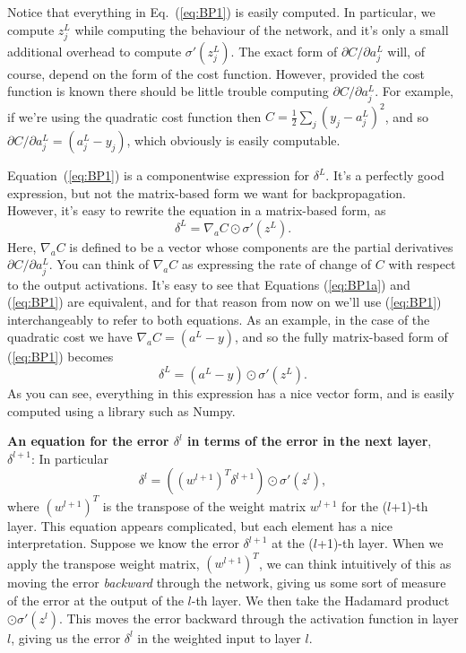 \documentclass[a4paper,twoside,10pt]{book}
\begin{document}
Notice that everything in Eq.~(\ref{eq:BP1}) is easily computed. In particular, we compute $z^L_j$ while computing the behaviour of the network, and it's only a small additional overhead to compute $\sigma'(z^L_j)$. The exact form of $\partial{}C/\partial{}a^L_j$ will, of course, depend on the form of the cost function. However, provided the cost function is known there should be little trouble computing $\partial{}C/\partial{}a^L_j$. For example, if we're using the quadratic cost function then $C=\frac12\sum_j(y_j-a^L_j)^2$, and so $\partial{}C/\partial{}a^L_j=(a^L_j-y_j)$, which obviously is easily computable.

Equation~(\ref{eq:BP1}) is a componentwise expression for $\delta^L$. It's a perfectly good expression, but not the matrix-based form we want for backpropagation. However, it's easy to rewrite the equation in a matrix-based form, as
\begin{equation}
\delta^L = \nabla_a C \odot \sigma'(z^L).
\tag{BP1a}\label{eq:BP1a}
\end{equation}
Here, $\nabla_a C$ is defined to be a vector whose components are the partial derivatives $\partial{}C/\partial{}a^L_j$. You can think of $\nabla_a C$ as expressing the rate of change of $C$ with respect to the output activations. It's easy to see that Equations (\ref{eq:BP1a}) and (\ref{eq:BP1}) are equivalent, and for that reason from now on we'll use (\ref{eq:BP1}) interchangeably to refer to both equations. As an example, in the case of the quadratic cost we have $\nabla_a C =(a^L-y)$, and so the fully matrix-based form of (\ref{eq:BP1}) becomes
\begin{equation}
\delta^L = (a^L-y) \odot \sigma'(z^L).
\tag{30}\label{eq:30}
\end{equation}
As you can see, everything in this expression has a nice vector form, and is easily computed using a library such as Numpy.

\textbf{An equation for the error $\delta^l$ in terms of the error in the next layer}, $\delta^{l+1}$: In particular
\begin{equation}
	\delta^l = \left((w^{l+1})^T \delta^{l+1}\right) \odot \sigma'(z^l),
	\tag{BP2}\label{eq:BP2}
\end{equation}
where $(w^{l+1})^T$ is the transpose of the weight matrix $w^{l+1}$ for the ($l$+1)-th layer. This equation appears complicated, but each element has a nice interpretation. Suppose we know the error $\delta^{l+1}$ at the ($l$+1)-th layer. When we apply the transpose weight matrix, $(w^{l+1})^T$, we can think intuitively of this as moving the error \textit{backward} through the network, giving us some sort of measure of the error at the output of the $l$-th layer. We then take the Hadamard product $\odot \sigma'(z^l)$. This moves the error backward through the activation function in layer $l$, giving us the error $\delta^l$ in the weighted input to layer $l$.
\end{document}
